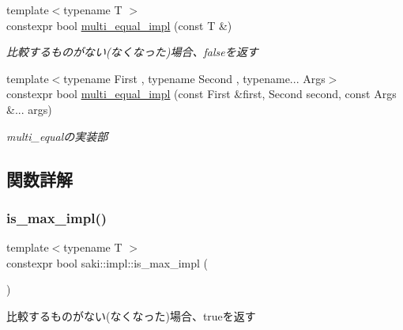 \begin{DoxyCompactItemize}
{\footnotesize template$<$typename T $>$ }\\constexpr bool \mbox{\hyperlink{namespacesaki_1_1impl_ac271639854025a923addee4879780f96}{multi\+\_\+equal\+\_\+impl}} (const T \&)
\begin{DoxyCompactList}\small\item\em 比較するものがない(なくなった)場合、falseを返す \end{DoxyCompactList}\item 
{\footnotesize template$<$typename First , typename Second , typename... Args$>$ }\\constexpr bool \mbox{\hyperlink{namespacesaki_1_1impl_a45ac6c0cbcb74e4c612f3b66352defff}{multi\+\_\+equal\+\_\+impl}} (const First \&first, Second second, const Args \&... args)
\begin{DoxyCompactList}\small\item\em multi\+\_\+equalの実装部 \end{DoxyCompactList}\end{DoxyCompactItemize}


\subsection{関数詳解}
\mbox{\label{namespacesaki_1_1impl_a1eb562842d6a5bcde39a463f04755157}} 
\subsubsection{\texorpdfstring{is\+\_\+max\+\_\+impl()}{is\_max\_impl()}\hspace{0.1cm}{\footnotesize\ttfamily [1/2]}}
{\footnotesize\ttfamily template$<$typename T $>$ \\
constexpr bool saki\+::impl\+::is\+\_\+max\+\_\+impl (\begin{DoxyParamCaption}\item[{const T \&}]{ }\end{DoxyParamCaption})}



比較するものがない(なくなった)場合、trueを返す 

\mbox{\label{namespacesaki_1_1impl_aa2d9e924789f49e245eca3d8fa7a57ed}} 
